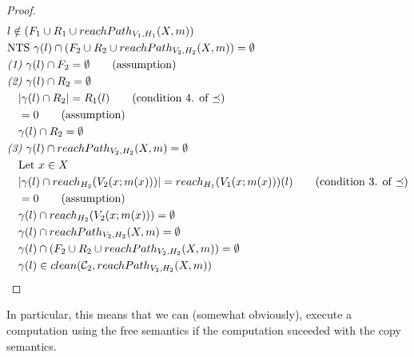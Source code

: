 \documentclass[11pt]{article}
\theoremstyle{definition}
\begin{document}
\begin{proof}
\begin{align*}
		&l \notin (F_1 \cup R_1 \cup reachPath_{V_1,H_1}(X,m))\\
		&\text{NTS } \gamma(l) \cap (F_2 \cup R_2 \cup reachPath_{V_2,H_2}(X,m)) = \emptyset\\
		&\emph{(1) } \gamma(l) \cap F_2 = \emptyset \tag{assumption}\\
		&\emph{(2) } \gamma(l) \cap R_2 = \emptyset\\
		&\quad |\gamma(l) \cap R_2| = R_1(l) \tag{condition 4. of $\preceq$}\\ 
		&\quad = 0 \tag{assumption}\\
		&\quad \gamma(l) \cap R_2 = \emptyset\\
		&\emph{(3) } \gamma(l) \cap reachPath_{V_2,H_2}(X,m) = \emptyset\\
		&\quad \text{Let } x \in X\\
		&\quad |\gamma(l) \cap reach_{H_2}(V_2(x;m(x)))| = reach_{H_1}(V_1(x;m(x)))(l) 
			\tag{condition 3. of $\preceq$}\\
		&\quad = 0 \tag{assumption}\\
		&\quad\gamma(l) \cap reach_{H_2}(V_2(x;m(x))) = \emptyset\\
		&\quad\gamma(l) \cap reachPath_{V_2,H_2}(X,m) = \emptyset\\
		&\quad\gamma(l) \cap (F_2 \cup R_2 \cup reachPath_{V_2,H_2}(X,m)) = \emptyset\\
		&\quad\gamma(l) \in clean(\mathcal{C}_2,reachPath_{V_2,H_2}(X,m))
	\end{align*}
\end{proof}
In particular, this means that we can (somewhat obviously), execute a computation using the free semantics
if the computation suceeded with the copy semantics. 
\end{document}
